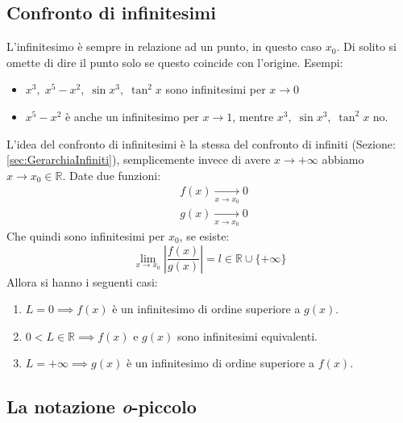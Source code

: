 \subsection{Confronto di infinitesimi}
L'infinitesimo è sempre in relazione ad un punto, in questo caso $x_0$. Di solito si omette di dire il punto solo se questo coincide con l'origine. Esempi:
\begin{itemize}
	\item $x^3,\; x^5 - x^2,\; \sin{x^3},\; \tan^2{x}$ sono infinitesimi per $x \to 0$
	
	\item $x^5 - x^2$ è anche un infinitesimo per $x \to 1$, mentre $x^3,\; \sin{x^3},\; \tan^2{x}$ no.
\end{itemize}

L'idea del confronto di infinitesimi è la stessa del confronto di infiniti (Sezione: \ref{sec:GerarchiaInfiniti}), semplicemente invece di avere $x \to +\infty$ abbiamo $x \to x_0 \in \mathbb{R}$. Date due funzioni:
\begin{align*}
	&f(x) \xrightarrow[x \to x_0]{} 0\\
	&g(x) \xrightarrow[x \to x_0]{} 0
\end{align*}
Che quindi sono infinitesimi per $x_0$, se esiste:
\begin{equation*}
	\lim_{x \to x_0} \left| \dfrac{f(x)}{g(x)} \right| = l \in \mathbb{R} \cup \{+\infty\}
\end{equation*}
Allora si hanno i seguenti casi:
\begin{enumerate}
	\item $L = 0 \implies f(x)$ è un infinitesimo di ordine superiore a $g(x)$.

	\item $0 < L \in \mathbb{R} \implies f(x)$ e $g(x)$ sono infinitesimi equivalenti.

	\item $L = +\infty \implies g(x)$ è un infinitesimo di ordine superiore a $f(x)$.
\end{enumerate}

\subsection{La notazione \textit{o}-piccolo}

